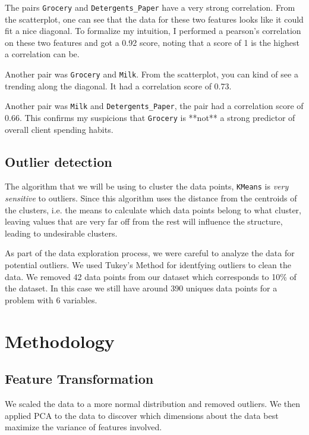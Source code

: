 \documentclass[twoside,openright,titlepage,numbers=noenddot,headinclude,%
               footinclude=true,cleardoublepage=empty,abstractoff,BCOR=5mm,%
               paper=a4,fontsize=11pt,ngerman,american]{scrreprt}
\numberwithin{theorem}{chapter}
\numberwithin{definition}{chapter}
\numberwithin{algorithm}{chapter}
\numberwithin{figure}{chapter}
\numberwithin{table}{chapter}
\numberwithin{equation}{chapter}
\begin{document}
The pairs \texttt{Grocery} and \texttt{Detergents\_Paper} have a very strong correlation. From the scatterplot, one can see that the data for these two features looks like it could fit a nice diagonal. To formalize my intuition, I performed a pearson's correlation on these two features and got a 0.92 score, noting that a score of 1 is the highest a correlation can be.

Another pair was \texttt{Grocery} and \texttt{Milk}. From the scatterplot, you can kind of see a trending along the diagonal. It had a correlation score of 0.73.

Another pair was \texttt{Milk} and \texttt{Detergents\_Paper}, the pair had a correlation score of 0.66. This confirms my suspicions that \texttt{Grocery} is **not** a strong predictor of overall client spending habits.




\section*{Outlier detection}
The algorithm that we will be using to cluster the data points, \texttt{KMeans} is \emph{very sensitive} to outliers. Since this algorithm uses the distance from the centroids of the clusters, i.e. the means to calculate which data points belong to what cluster, leaving values that are very far off from the rest will influence the structure, leading to undesirable clusters.

As part of the data exploration process, we were careful to analyze the data for potential outliers. We used Tukey's Method for identfying outliers to clean the data. We removed 42 data points from our dataset which corresponds to 10\% of the dataset. In this case we still have around 390 uniques data points for a problem with 6 variables. 


\chapter*{Methodology}

\section*{Feature Transformation}
We scaled the data to a more normal distribution and  removed outliers. We then applied PCA to the data to discover which dimensions about the data best maximize the variance of features involved. 
\end{document}
